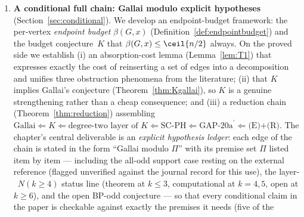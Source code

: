 \begin{enumerate}[label=(\roman*),leftmargin=2em]
induction stops at exactly this configuration. No counterexample is known: exact dynamic programs verify the conjecture with
zero violations on $579$ instances ($166$ from the computational study behind this paper, a further
$413$ in Appendix~\ref{app:comp}), and $15$ large verified decompositions achieve the bound.
Odd-order graphs in the (A1) class admit a density ceiling
(Proposition~\ref{prop:odddensity}), which in particular shows that the sharpness family of
Proposition~\ref{prop:oscsharp} lies exactly on the other side of (A1). Our witness family
$W(m)$, $m$ odd $\ge 5$, satisfies all hypotheses with $\EV(W(m))\cong K_{2,m}$, has treewidth
$5$, degeneracy $5$, and maximum degree at least $m+1$, hence escapes every published class we are aware
of --- in particular \cite{ZLH24,LY24,BP19,BCLS20,CFL} --- and
Proposition~\ref{prop:escape} shows that Theorem~\ref{thm:Astar} is currently the only known
result implying the $\floor{n/2}$ bound on $W(m)$. We also exhibit the odd semi-cliques
$K_{2k+1}-(k-1)K_2$, on which $\pn=\ceil{n/2}>\floor{n/2}$ for all $k$, showing that the
triangle-free requirement cannot simply be dropped.
\item \textbf{A conditional full chain: Gallai modulo explicit hypotheses}
(Section~\ref{sec:conditional}). We develop an endpoint-budget framework: the per-vertex
\emph{endpoint budget} $\beta(G,x)$ (Definition~\ref{def:endpointbudget}) and the budget
conjecture~$K$ that $\beta(G,x)\le\ceil{n/2}$ always. On the proved side we establish (i) an
absorption-cost lemma (Lemma~\ref{lem:T1}) that expresses exactly the cost of reinserting a set
of edges into a decomposition and unifies three obstruction phenomena from the literature;
(ii) that $K$ implies Gallai's conjecture (Theorem~\ref{thm:Kgallai}), so $K$ is a genuine
strengthening rather than a cheap consequence; and (iii) a reduction chain
(Theorem~\ref{thm:reduction}) assembling
$\text{Gallai}\Leftarrow K\Leftarrow\text{degree-two layer of }K\Leftarrow
\text{SC-PH}\Leftarrow\text{GAP-20a}^{\prime}\Leftarrow\text{(E)+(R)}$. The chapter's central
deliverable is an \emph{explicit hypothesis ledger}: each edge of the chain is stated in the
form ``Gallai modulo $\Pi$'' with its premise set $\Pi$ listed item by item --- including the
all-odd support case resting on the external reference \cite{Lo68} (flagged unverified against
the journal record for this use), the layer-~$N(k\ge4)$ status line (theorem at $k\le3$,
computational at $k=4,5$, open at $k\ge6$), and the open BP-odd conjecture --- so that every
conditional claim in the paper is checkable against exactly the premises it needs (five of the

\end{enumerate}
